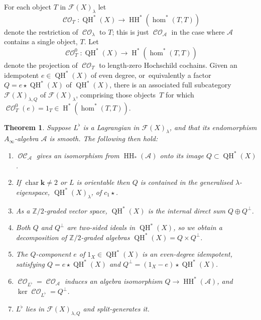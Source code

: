 \documentclass[JEP,XML,SOM,Unicode,NoEqCountersInSection,NoFloatCountersInSection,published]{cedram}
\newtheorem{theorem}{Theorem}[section]
\theoremstyle{definition}
\newcommand{\ZZ}{\mathbb{Z}}
\newcommand{\LL}{L^\flat}
\newcommand{\calA}{\mathcal{A}}
\newcommand{\Fuk}{\mathcal{F}}
\newcommand{\kk}{{\boldsymbol{k}}}
\newcommand{\Char}{\operatorname{char}}
\newcommand{\rH}{\operatorname{H}}
\newcommand{\HH}{\operatorname{HH}}
\newcommand{\CO}{\operatorname{\mathcal{CO}}}
\newcommand{\OC}{\operatorname{\mathcal{OC}}}
\newcommand{\QH}{\operatorname{QH}}
\newcommand{\qprod}{\mathbin{\star}}
\begin{document}
For each object $T$ in $\Fuk(X)_\lambda$ let
\[
\CO_T : \QH^*(X) \to \HH^*(\hom^*(T, T))
\]
denote the restriction of $\CO_\lambda$ to $T$; this is just $\CO_\calA$ in the case where $\calA$ contains a single object, $T$. Let
\[
\CO^0_T : \QH^*(X) \to \rH^*(\hom^*(T, T))
\]
denote the projection of $\CO_T$ to length-zero Hochschild cochains. Given an idempotent $e \in \QH^*(X)$ of even degree, or~equivalently a factor $Q = e \qprod \QH^*(X)$ of $\QH^*(X)$, there is an associated full subcategory $\Fuk(X)_{\lambda,Q}$ of $\Fuk(X)_\lambda$, comprising those objects~$T$ for which $\CO^0_T(e) = 1_T \in \rH^*(\hom^*(T, T))$.

\begin{theorem}
\label{thmGen}
Suppose $\LL$ is a Lagrangian in $\Fuk(X)_\lambda$, and that its endomorphism $A_\infty$-algebra $\calA$ is smooth. The following then hold:
\begin{enumerate}
\item\label{genOC} $\OC_\calA$ gives an isomorphism from $\HH_*(\calA)$ onto its image $Q \subset \QH^*(X)$.
\item\label{genEspace} If $\Char \kk \neq 2$ or $L$ is orientable then $Q$ is contained in the generalised $\lambda$\nobreakdash-eigen\-space, $\QH^*(X)_\lambda$, of $c_1\qprod$.
\item\label{genVSdecomp} As a $\ZZ/2$-graded vector space, $\QH^*(X)$ is the internal direct sum $Q \oplus Q^\perp$.
\item\label{genAlgDecomp} Both $Q$ and $Q^\perp$ are two-sided ideals in $\QH^*(X)$, so we obtain a decomposition of $\ZZ/2$-graded algebras $\QH^*(X) = Q \times Q^\perp$.
\item\label{genIdemp} The $Q$-component $e$ of $1_X \in \QH^*(X)$ is an even-degree idempotent, satisfying $Q = e \qprod \QH^*(X)$ and $Q^\perp = (1_X-e) \qprod \QH^*(X)$.
\item\label{genCO} $\CO_{\LL} \!=\! \CO_\calA$ induces an algebra isomorphism $Q \!\to\! \HH^*(\calA)$, and \hbox{$\ker \CO_{\LL} \!=\! Q^\perp$}.
\item\label{genSplitGen} $\LL$ lies in $\Fuk(X)_{\lambda, Q}$ and split-generates it.
\end{enumerate}
\end{theorem}
\end{document}
